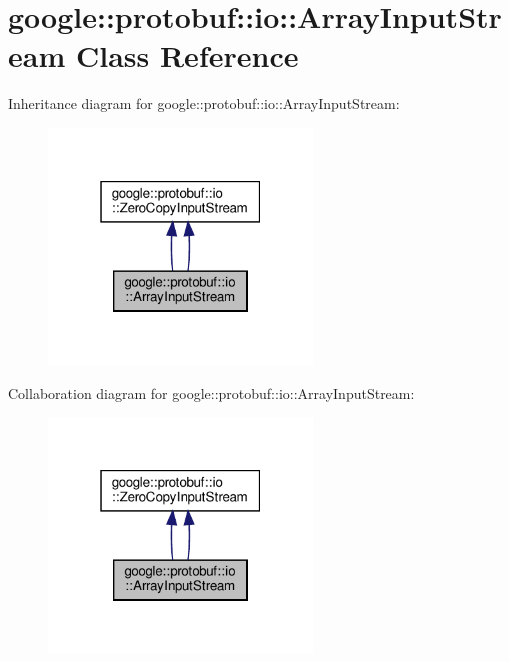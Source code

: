 \hypertarget{classgoogle_1_1protobuf_1_1io_1_1ArrayInputStream}{}\section{google\+:\+:protobuf\+:\+:io\+:\+:Array\+Input\+Stream Class Reference}
\label{classgoogle_1_1protobuf_1_1io_1_1ArrayInputStream}


Inheritance diagram for google\+:\+:protobuf\+:\+:io\+:\+:Array\+Input\+Stream\+:
\nopagebreak
\begin{figure}[H]
\begin{center}
\leavevmode
\includegraphics[width=199pt]{classgoogle_1_1protobuf_1_1io_1_1ArrayInputStream__inherit__graph}
\end{center}
\end{figure}


Collaboration diagram for google\+:\+:protobuf\+:\+:io\+:\+:Array\+Input\+Stream\+:
\nopagebreak
\begin{figure}[H]
\begin{center}
\leavevmode
\includegraphics[width=199pt]{classgoogle_1_1protobuf_1_1io_1_1ArrayInputStream__coll__graph}
\end{center}
\end{figure}
